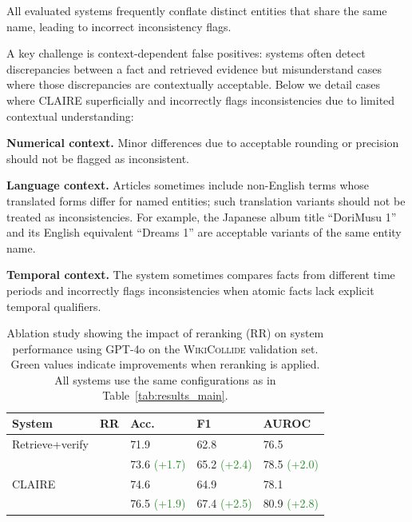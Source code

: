 \documentclass[11pt]{article}
\newcommand{\cmark}{\ding{51}}
\newcommand{\xmark}{\ding{55}}
\newcommand{\dataset}[0]{\textsc{WikiCollide}\xspace}
\newcommand{\system}[0]{\textsc{CLAIRE}\xspace}
\begin{document}
All evaluated systems frequently conflate distinct entities that share the same name, leading to incorrect inconsistency flags.

A key challenge is context-dependent false positives: systems often detect discrepancies between a fact and retrieved evidence but misunderstand cases where those discrepancies are contextually acceptable. Below we detail cases where \system superficially and incorrectly flags inconsistencies due to limited contextual understanding:

\textbf{Numerical context.} Minor differences due to acceptable rounding or precision should not be flagged as inconsistent.

\textbf{Language context.} Articles sometimes include non-English terms whose translated forms differ for named entities; such translation variants should not be treated as inconsistencies. For example, the Japanese album title ``DoriMusu 1'' and its English equivalent ``Dreams 1'' are acceptable variants of the same entity name.

\textbf{Temporal context.} The system sometimes compares facts from different time periods and incorrectly flags inconsistencies when atomic facts lack explicit temporal qualifiers.

\begin{table}[ht!]
\centering
\small
\setlength{\tabcolsep}{3pt}
\begin{tabular}{lllll}
    \toprule
    \textbf{System} & \textbf{RR} & \textbf{Acc.} & \textbf{F1} & \textbf{AUROC} \\
    \midrule
    Retrieve+verify & \xmark & 71.9 & 62.8 & 76.5  \\
    ~ & \cmark & 73.6 \textcolor{ForestGreen}{\tiny(+1.7)}& 65.2 \textcolor{ForestGreen}{\tiny(+2.4)} & 78.5 \textcolor{ForestGreen}{\tiny(+2.0)} \\
    \system & \xmark & 74.6 & 64.9 & 78.1  \\
    ~ & \cmark & 76.5 \textcolor{ForestGreen}{\tiny(+1.9)}& 67.4 \textcolor{ForestGreen}{\tiny(+2.5)} & 80.9 \textcolor{ForestGreen}{\tiny(+2.8)}  \\
    \bottomrule
\end{tabular}
\caption{Ablation study showing the impact of reranking (RR) on system performance using GPT-4o on the \dataset validation set. Green values indicate improvements when reranking is applied. All systems use the same configurations as in Table~\ref{tab:results_main}.}
\label{tab:reranker_ablation}
\end{table}
    
\end{document}

